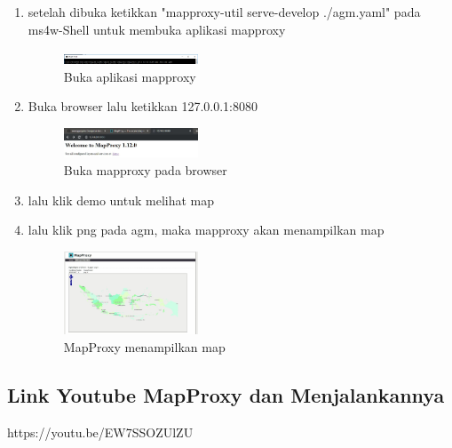 \begin{enumerate}
  \item setelah dibuka ketikkan "mapproxy-util serve-develop ./agm.yaml" pada ms4w-Shell untuk membuka aplikasi mapproxy
  \hfill\break
  \begin{figure}[H]
  \includegraphics[width=4cm]{figures/tugas4/1174080/util.PNG}
  \centering
  \caption{Buka aplikasi mapproxy}
  \end{figure}
  
  \item Buka browser lalu ketikkan 127.0.0.1:8080
  \hfill\break
  \begin{figure}[H]
  \includegraphics[width=4cm]{figures/tugas4/1174080/web.jpg}
  \centering
  \caption{Buka mapproxy pada browser}
  \end{figure}

  \item lalu klik demo untuk melihat map
  \item lalu klik png pada agm, maka mapproxy akan menampilkan map
  \hfill\break
  \begin{figure}[H]
  \includegraphics[width=4cm]{figures/tugas4/1174080/mapjadi.PNG}
  \centering
  \caption{MapProxy menampilkan map}
  \end{figure}

\end{enumerate}

\subsection{Link Youtube MapProxy dan Menjalankannya}
https://youtu.be/EW7SSOZUlZU